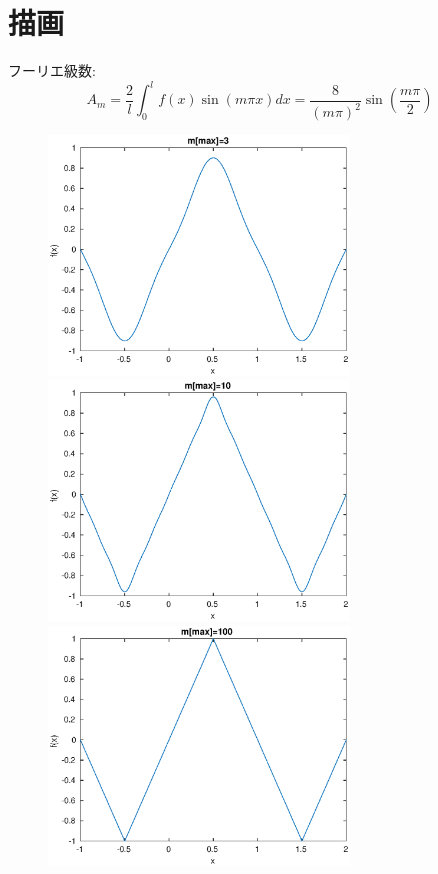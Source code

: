 \documentclass{jreport}
\begin{document}
\section{描画}
フーリエ級数:
$$
A_m = \frac{2}{l} \int_0^l f(x) \sin(m\pi x) dx = \frac{8}{(m \pi)^2}\sin(\frac{m\pi}{2})
$$
\begin{figure}[H]
	\centering
        \includegraphics[width=8cm]{max3.eps}
        \includegraphics[width=8cm]{max10.eps}
        \includegraphics[width=8cm]{max100.eps}
\end{figure}
\end{document}
